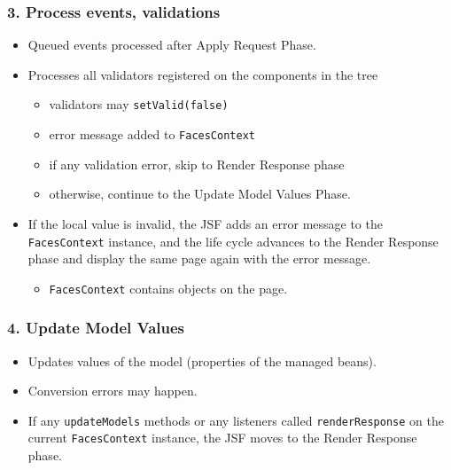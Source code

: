 \documentclass[10pt,xcolor=pdflatex]{beamer}
\begin{document}
\begin{frame}\frametitle{3. Process events, validations}
      \begin{itemize}
          \item Queued events processed after Apply Request Phase.
          \item Processes all validators registered on the components in the tree
            \begin{itemize}
              \item validators may \texttt{setValid(false) }
              \item error message added to \texttt{FacesContext}
              \item if any validation error, skip to Render Response phase
              \item otherwise, continue to the Update Model Values Phase.
            \end{itemize}
          \item If the local value is invalid, the JSF adds an error message to the \texttt{FacesContext} instance, and the life cycle advances to the Render Response phase and display the same page again with the error message.
            \begin{itemize}
              \item \texttt{FacesContext} contains objects on the page.
            \end{itemize}
      \end{itemize}
\end{frame}


\begin{frame}\frametitle{4. Update Model Values}
	\begin{itemize}
		\item Updates values of the model (properties of the managed beans).
		\item Conversion errors may happen.
		\item If any \texttt{updateModels} methods or any listeners called \texttt{renderResponse} on the current \texttt{FacesContext} instance, the JSF moves to the Render Response phase.
	\end{itemize}
\end{frame}
\end{document}
